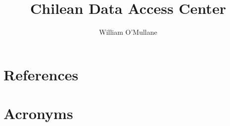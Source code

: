 \documentclass[DM]{lsstdoc}
\title[Chilean DAC ]{ Chilean Data Access Center }
\author   {William O'Mullane}
\begin{document}
%
%
\maketitle

\renewcommand{\thepage}{\arabic{page}}%

\setcounter{page}{1}%
%
%


\section{References\label{sect:references}}
\renewcommand{\refname}{}


\section{Acronyms}
\end{document}

